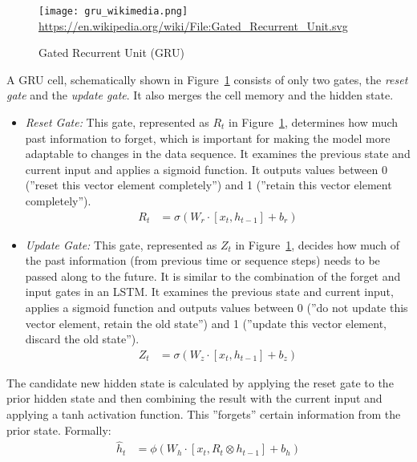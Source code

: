\begin{figure}
\centering

\texttt{[image: gru\_wikimedia.png]}
\scriptsize \url{https://en.wikipedia.org/wiki/File:Gated_Recurrent_Unit.svg} \normalsize
\caption{Gated Recurrent Unit (GRU)}
\label{fig:gru}
\end{figure}

A GRU cell, schematically shown in Figure~\ref{fig:gru} consists of only two gates, the \emph{reset gate} and the \emph{update gate}. It also merges the cell memory and the hidden state.

\begin{itemize}
\item \emph{Reset Gate:} This gate, represented as $R_t$ in Figure~\ref{fig:gru}, determines how much past information to forget, which is important for making the model more adaptable to changes in the data sequence. It examines the previous state and current input and applies a sigmoid function. It outputs values between 0 (''reset this vector element completely'') and 1 (''retain this vector element completely'').
\begin{align}
R_t &= \sigma (W_r \cdot [x_t, h_{t-1}] + b_r) \label{eq:reset}
\end{align}
\item \emph{Update Gate:} This gate, represented as $Z_t$ in Figure~\ref{fig:gru}, decides how much of the past information (from previous time or sequence steps) needs to be passed along to the future. It is similar to the combination of the forget and input gates in an LSTM. It examines the previous state and current input, applies a sigmoid function and outputs values between 0 (''do not update this vector element, retain the old state'') and 1 (''update this vector element, discard the old state''). 
\begin{align}
Z_t &= \sigma (W_z \cdot [x_t, h_{t-1}] + b_z) \label{eq:update}
\end{align}
\end{itemize}

The candidate new hidden state is calculated by applying the reset gate to the prior hidden state and then combining the result with the current input and applying a tanh activation function. This ''forgets'' certain information from the prior state. Formally:
\begin{align}
\hat{h}_t &= \phi (W_h \cdot [x_t, R_t \otimes h_{t-1}] + b_h) \label{eq:candidategru}
\end{align}

